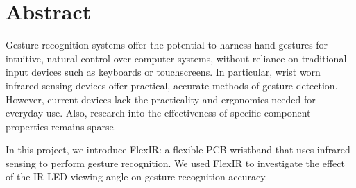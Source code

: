 \documentclass[ oneside,%
                    author={Jack Jarvis},
                    degree={BSc},
                     title={FlexIR: Flexible PCB Wristbands for Infrared Based Gesture Recognition},
                    unit={COMS30045},
                    subtitle={Investigating the Effect of LED Viewing Angle on Gesture Classification in Infrared Sensing Systems}]{dissertation}
\begin{document}




\maketitle


\frontmatter





\chapter*{Abstract}

Gesture recognition systems offer the potential to harness hand gestures for intuitive, natural control over computer systems, without reliance on traditional input devices such as keyboards or touchscreens. In particular, wrist worn infrared sensing devices offer practical, accurate methods of gesture detection. However, current devices lack the practicality and ergonomics needed for everyday use. Also, research into the effectiveness of specific component properties remains sparse.

In this project, we introduce FlexIR: a flexible PCB wristband that uses infrared sensing to perform gesture recognition. We used FlexIR to investigate the effect of the IR LED viewing angle on gesture recognition accuracy.
\end{document}
